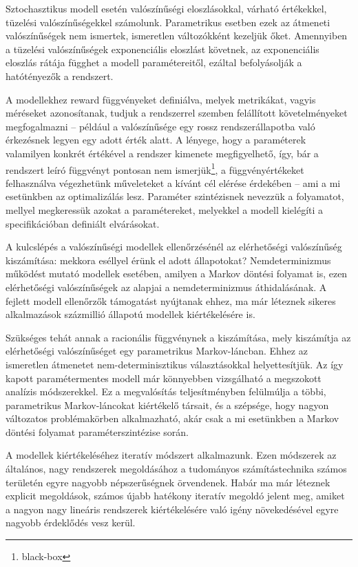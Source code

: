 Sztochasztikus modell esetén valószínűségi eloszlásokkal, várható értékekkel, tüzelési valószínűségekkel számolunk. Parametrikus esetben ezek az átmeneti valószínűségek nem ismertek, ismeretlen változókként kezeljük őket. Amennyiben a  tüzelési valószínűségek exponenciális eloszlást követnek, az exponenciális eloszlás rátája függhet a modell paramétereitől, ezáltal befolyásolják a hatótényezők a rendszert.

A modellekhez reward függvényeket definiálva, melyek metrikákat, vagyis méréseket azonosítanak, tudjuk a rendszerrel szemben felállított követelményeket megfogalmazni -- például a valószínűsége egy rossz rendszerállapotba való érkezésnek legyen egy adott érték alatt. A lényege, hogy a paraméterek valamilyen konkrét értékével a rendszer kimenete megfigyelhető, így, bár a rendszert leíró függvényt pontosan nem ismerjük\footnote{black-box}, a függvényértékeket felhasználva végezhetünk műveleteket a kívánt cél elérése érdekében -- ami a mi esetünkben az optimalizálás lesz. Paraméter szintézisnek nevezzük a folyamatot, mellyel megkeressük azokat a paramétereket, melyekkel a modell kielégíti a specifikációban definiált elvárásokat.

A kulcslépés a valószínűségi modellek ellenőrzésénél az elérhetőségi valószínűség kiszámítása: mekkora eséllyel érünk el adott állapotokat? Nemdeterminizmus működést mutató modellek esetében, amilyen a Markov döntési folyamat is, ezen elérhetőségi valószínűségek az alapjai a nemdeterminizmus áthidalásának. A fejlett modell ellenőrzők támogatást nyújtanak ehhez, ma már léteznek sikeres alkalmazások százmillió állapotú modellek kiértékelésére is.

Szükséges tehát annak a racionális függvénynek a kiszámítása, mely kiszámítja az elérhetőségi valószínűséget egy parametrikus Markov-láncban.
Ehhez az ismeretlen átmenetet nem-determinisztikus választásokkal helyettesítjük. Az így kapott paramétermentes modell már könnyebben vizsgálható a megszokott analízis módszerekkel. Ez a megvalósítás teljesítményben felülmúlja a többi, parametrikus Markov-láncokat kiértékelő társait, és a szépsége, hogy nagyon változatos problémakörben alkalmazható, akár csak a mi esetünkben a Markov döntési folyamat paraméterszintézise során.\cite{ParameterSzintezisCikk}

A modellek kiértékeléséhez iteratív módszert alkalmazunk. Ezen módszerek az általános, nagy %
rendszerek megoldásához a tudományos számítástechnika számos területén egyre nagyobb népszerűségnek örvendenek. Habár ma már léteznek explicit megoldások, számos újabb hatékony iteratív megoldó %
jelent meg, amiket a nagyon nagy lineáris rendszerek kiértékelésére való igény növekedésével egyre nagyobb érdeklődés vesz kerül.


